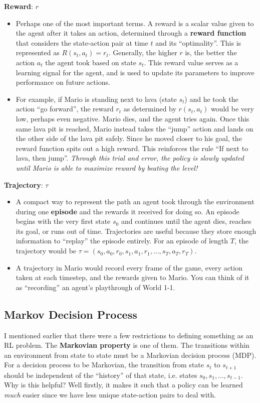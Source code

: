     \textbf{Reward}: $r$
    \begin{itemize}
        \item Perhaps one of the most important terms. A reward is a scalar value given to the agent after it takes an action, determined through a \textbf{reward function} that considers the state-action pair at time $t$ and its ``optimality''. This is represented as $R(s_t, a_t) = r_t$. Generally, the higher $r$ is, the better the action $a_t$ the agent took based on state $s_t$. This reward value serves as a learning signal for the agent, and is used to update its parameters to improve performance on future actions.
        \item For example, if Mario is standing next to lava (state $s_t$) and he took the action ``go forward'', the reward $r_t$ as determined by $r(s_t, a_t)$ would be very low, perhaps even negative. Mario dies, and the agent tries again. Once this same lava pit is reached, Mario instead takes the ``jump'' action and lands on the other side of the lava pit safely. Since he moved closer to his goal, the reward function spits out a high reward. This reinforces the rule ``If next to lava, then jump''. \textit{Through this trial and error, the policy is slowly updated until Mario is able to maximize reward by beating the level!}
    \end{itemize}

    \textbf{Trajectory}: $\tau$
    \begin{itemize}
        \item A compact way to represent the path an agent took through the environment during one \textbf{episode} and the rewards it received for doing so. An episode begins with the very first state $s_0$ and continues until the agent dies, reaches its goal, or runs out of time. Trajectories are useful because they store enough information to ``replay'' the episode entirely. For an episode of length $T$, the trajectory would be $\tau = (s_0, a_0, r_0, s_1, a_1, r_1,...,s_T, a_T, r_T)$.
        \item A trajectory in Mario would record every frame of the game, every action taken at each timestep, and the rewards given to Mario. You can think of it as ``recording'' an agent's playthrough of World 1-1.
    \end{itemize}
    

\subsection{Markov Decision Process}
    \large I mentioned earlier that there were a few restrictions to defining something as an RL problem. The \textbf{Markovian property} is one of them. The transitions within an environment from state to state must be a Markovian decision process (MDP). For a decision process to be Markovian, the transition from state $s_t$ to $s_{t+1}$ should be independent of the ``history'' of that state, i.e. states $s_0, s_1,...,s_{t-1}$. Why is this helpful? Well firstly, it makes it such that a policy can be learned \textit{much} easier since we have less unique state-action pairs to deal with. 
    
